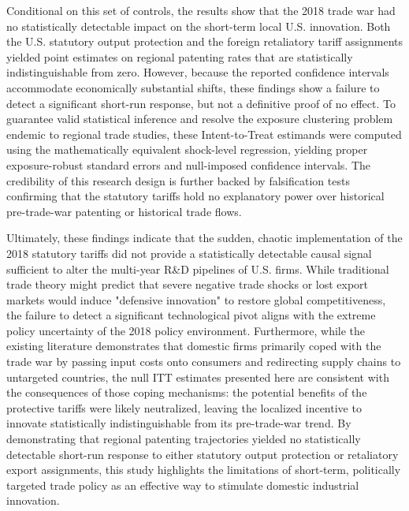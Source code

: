 \documentclass[12pt]{article}
\numberwithin{figure}{section}
\numberwithin{table}{section}
\begin{document}
Conditional on this set of controls, the results show that the 2018 trade war had no statistically detectable impact on the short-term local U.S. innovation. Both the U.S. statutory output protection and the foreign retaliatory tariff assignments yielded point estimates on regional patenting rates that are statistically indistinguishable from zero. However, because the reported confidence intervals accommodate economically substantial shifts, these findings show a failure to detect a significant short-run response, but not a definitive proof of no effect. To guarantee valid statistical inference and resolve the exposure clustering problem endemic to regional trade studies, these Intent-to-Treat estimands were computed using the mathematically equivalent shock-level regression, yielding proper exposure-robust standard errors and null-imposed confidence intervals. The credibility of this research design is further backed by falsification tests confirming that the statutory tariffs hold no explanatory power over historical pre-trade-war patenting or historical trade flows.

Ultimately, these findings indicate that the sudden, chaotic implementation of the 2018 statutory tariffs did not provide a statistically detectable causal signal sufficient to alter the multi-year R\&D pipelines of U.S. firms. While traditional trade theory might predict that severe negative trade shocks or lost export markets would induce "defensive innovation" to restore global competitiveness, the failure to detect a significant technological pivot aligns with the extreme policy uncertainty of the 2018 policy environment. Furthermore, while the existing literature demonstrates that domestic firms primarily coped with the trade war by passing input costs onto consumers and redirecting supply chains to untargeted countries, the null ITT estimates presented here are consistent with the consequences of those coping mechanisms: the potential benefits of the protective tariffs were likely neutralized, leaving the localized incentive to innovate statistically indistinguishable from its pre-trade-war trend. By demonstrating that regional patenting trajectories yielded no statistically detectable short-run response to either statutory output protection or retaliatory export assignments, this study highlights the limitations of short-term, politically targeted trade policy as an effective way to stimulate domestic industrial innovation.



\newpage
{} %
\cleardoublepage
{}
{}
\nocite{*}
\begin{singlespace} %
    
\end{singlespace}
\end{document}

